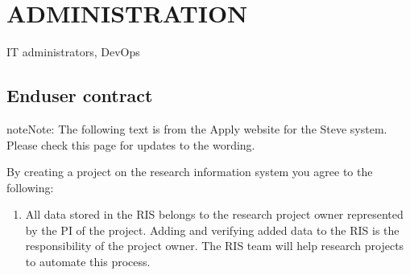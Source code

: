 \documentclass[letterpaper,10pt,english]{sphinxmanual}
\begin{document}
\sphinxstepscope


\chapter{ADMINISTRATION}
\label{\detokenize{ServerAdmin/index:administration}}\label{\detokenize{ServerAdmin/index::doc}}
\sphinxAtStartPar
{} IT administrators, DevOps


\section{End\sphinxhyphen{}user contract}
\label{\detokenize{ServerAdmin/index:end-user-contract}}
\begin{sphinxadmonition}{note}{Note:}
\sphinxAtStartPar
The following text is from the Apply website for the Steve system. Please check this page for updates to the wording.
\end{sphinxadmonition}

\sphinxAtStartPar
By creating a project on the research information system you agree to the following:
\begin{enumerate}
%
\item {} 
\sphinxAtStartPar
All data stored in the RIS belongs to the research project owner represented by the PI of the project. Adding and verifying added data to the RIS is the responsibility of the project owner. The RIS team will help research projects to automate this process.

\end{enumerate}
\end{document}
